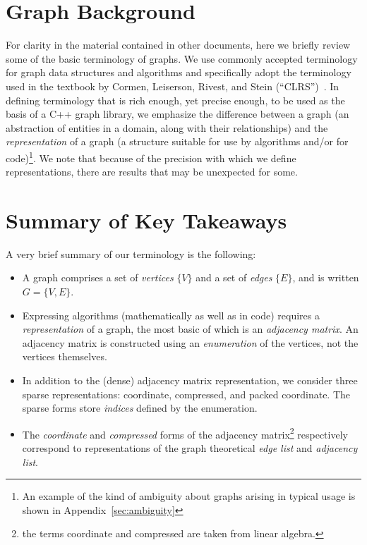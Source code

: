 


\section{Graph Background} %


For clarity in the material contained in other documents, here we briefly review some
of the basic terminology of graphs.  We use commonly accepted terminology for graph
data structures and algorithms and specifically adopt the terminology used in the
textbook by Cormen, Leiserson, Rivest, and Stein (``CLRS'')~\cite{CLRS2022}.
%
In defining terminology that is rich enough, yet precise enough, to be used as the basis of a C++ graph library, we emphasize the difference between a graph (an abstraction of entities in a domain, along with their relationships) and the \emph{representation} of a graph (a structure suitable for use by algorithms and/or for code)\footnote{An example of the kind of ambiguity about graphs arising in typical usage is shown in Appendix~\ref{sec:ambiguity}}.
%
We note that because of the precision with which we define representations, there are results that may be unexpected for some.

\section{Summary of Key Takeaways}
A very brief summary of our terminology is the following:
\begin{itemize}
  \item A graph comprises a set of \emph{vertices} $\{V\}$ and a set of \emph{edges} $\{E\}$, and is written $G=\{V, E\}$.
  \item Expressing algorithms (mathematically as well as in code) requires a \emph{representation} of a graph, the most basic of which is an \emph{adjacency matrix}.  An adjacency matrix is constructed using an \emph{enumeration} of the vertices, not the vertices themselves.
    \item In addition to the (dense) adjacency matrix representation, we consider three sparse representations: coordinate, compressed, and packed coordinate.  The sparse forms store \emph{indices} defined by the enumeration.
    \item The \emph{coordinate} and \emph{compressed} forms of the adjacency matrix\footnote{the terms coordinate and compressed are taken from linear algebra.} respectively correspond to representations of the graph theoretical 
\emph{edge list} and \emph{adjacency list}.
\end{itemize}


